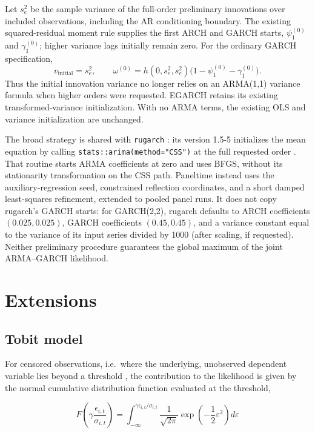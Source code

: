 \documentclass[12pt]{article}
\begin{document}
Let $s_e^2$ be the sample variance of the full-order preliminary innovations
over included observations, including the AR conditioning boundary. The
existing squared-residual moment rule supplies the first ARCH and GARCH
starts, $\psi_1^{(0)}$ and $\gamma_1^{(0)}$; higher variance lags initially
remain zero. For the ordinary GARCH specification,
\[
 v_{\mathrm{initial}}=s_e^2,\qquad
 \omega^{(0)}
 =h(0,s_e^2,s_e^2)\bigl(1-\psi_1^{(0)}-\gamma_1^{(0)}\bigr).
\]
Thus the initial innovation variance no longer relies on an ARMA(1,1)
variance formula when higher orders were requested. EGARCH retains its
existing transformed-variance initialization. With no ARMA terms, the
existing OLS and variance initialization are unchanged.

The broad strategy is shared with \texttt{rugarch}
\cite{ghalanos2024rugarch}: its version 1.5-5 initializes the mean equation by
calling \texttt{stats::arima(method="CSS")} at the full requested order
\cite{rcore2026arima}. That routine starts ARMA coefficients at zero and uses
BFGS, without its stationarity transformation on the CSS path. Paneltime
instead uses the auxiliary-regression seed, constrained reflection coordinates,
and a short damped least-squares refinement, extended to pooled panel runs.
It does not copy rugarch's GARCH starts: for GARCH(2,2), rugarch defaults to
ARCH coefficients $(0.025,0.025)$, GARCH coefficients $(0.45,0.45)$, and
a variance constant equal to the variance of its input series divided by
1000 (after scaling, if requested).
Neither preliminary procedure guarantees the global maximum of the joint
ARMA--GARCH likelihood.

\section{Extensions}

\subsection{Tobit model}\label{tobit-model}

For censored observations, i.e.\ where the underlying, unobserved dependent variable lies beyond a threshold \citep{tobin1958estimation,amemiya1973regression}, the contribution to the likelihood is given by the normal cumulative distribution function evaluated at the threshold,

\begin{equation}
F\left( \gamma\frac{\epsilon_{i,t}}{\sigma_{i,t}} \right) = \int_{- \infty}^{\gamma\epsilon_{i,t}/\sigma_{i,t}}{\frac{1}{\sqrt{2\pi}}\exp\left( - \frac{1}{2}\varepsilon^{2} \right)d\varepsilon}
\label{eq:censored}
\end{equation}
\end{document}
